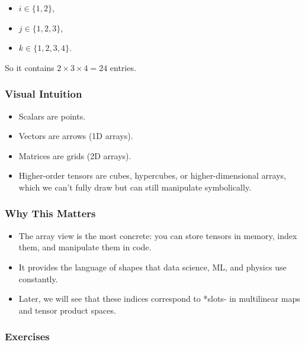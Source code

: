 \documentclass[
  letterpaper,
  DIV=11,
  numbers=noendperiod]{scrreprt}
\providecommand{\tightlist}{%
  \setlength{\itemsep}{0pt}\setlength{\parskip}{0pt}}
\begin{document}
\begin{itemize}
\tightlist
\item
  \(i \in \{1,2\}\),
\item
  \(j \in \{1,2,3\}\),
\item
  \(k \in \{1,2,3,4\}\).
\end{itemize}

So it contains \(2 \times 3 \times 4 = 24\) entries.

\subsubsection{Visual Intuition}\label{visual-intuition}

\begin{itemize}
\tightlist
\item
  Scalars are points.
\item
  Vectors are arrows (1D arrays).
\item
  Matrices are grids (2D arrays).
\item
  Higher-order tensors are cubes, hypercubes, or higher-dimensional
  arrays, which we can't fully draw but can still manipulate
  symbolically.
\end{itemize}

\subsubsection{Why This Matters}\label{why-this-matters}

\begin{itemize}
\tightlist
\item
  The array view is the most concrete: you can store tensors in memory,
  index them, and manipulate them in code.
\item
  It provides the language of shapes that data science, ML, and physics
  use constantly.
\item
  Later, we will see that these indices correspond to *slots- in
  multilinear maps and tensor product spaces.
\end{itemize}

\subsubsection{Exercises}\label{exercises-8}
\end{document}
